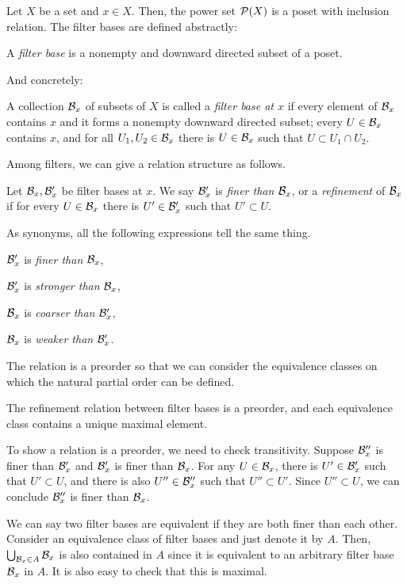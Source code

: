 \documentclass{../crs}
\begin{document}
Let $X$ be a set and $x\in X$.
Then, the power set $\mathcal{P}(X)$ is a poset with inclusion relation.
The filter bases are defined abstractly:
\begin{defn}
A \emph{filter base} is a nonempty and downward directed subset of a poset.
\end{defn}
And concretely:
\begin{defn}
A collection $\mathcal{B}_x$ of subsets of $X$ is called a \emph{filter base at $x$} if every element of $\mathcal{B}_x$ contains $x$ and it forms a nonempty downward directed subset; every $U\in\mathcal{B}_x$ contains $x$, and for all $U_1,U_2\in\mathcal{B}_x$ there is $U\in\mathcal{B}_x$ such that $U\subset U_1\cap U_2$.
\end{defn}

Among filters, we can give a relation structure as follows.

\begin{defn}
Let $\mathcal{B}_x,\mathcal{B}'_x$ be filter bases at $x$.
We say $\mathcal{B}'_x$ is \emph{finer than} $\mathcal{B}_x$, or a \emph{refinement} of $\mathcal{B}_x$ if for every $U\in\mathcal{B}_x$ there is $U'\in\mathcal{B}'_x$ such that $U'\subset U$.
\end{defn}

As synonyms, all the following expressions tell the same thing.
\begin{cond}
\item $\mathcal{B}'_x$ is \emph{finer than} $\mathcal{B}_x$,
\item $\mathcal{B}'_x$ is \emph{stronger than} $\mathcal{B}_x$,
\item $\mathcal{B}_x$ is \emph{coarser than} $\mathcal{B}'_x$,
\item $\mathcal{B}_x$ is \emph{weaker than} $\mathcal{B}'_x$.
\end{cond}
The relation is a preorder so that we can consider the equivalence classes on which the natural partial order can be defined.

\begin{prop}
The refinement relation between filter bases is a preorder, and each equivalence class contains a unique maximal element.
\end{prop}
\begin{pf}
To show a relation is a preorder, we need to check transitivity.
Suppose $\mathcal{B}''_x$ is finer than $\mathcal{B}'_x$ and $\mathcal{B}'_x$ is finer than $\mathcal{B}_x$.
For any $U\in\mathcal{B}_x$, there is $U'\in\mathcal{B}'_x$ such that $U'\subset U$, and there is also $U''\in\mathcal{B}''_x$ such that $U''\subset U'$.
Since $U''\subset U$, we can conclude $\mathcal{B}''_x$ is finer than $\mathcal{B}_x$.

We can say two filter bases are equivalent if they are both finer than each other.
Consider an equivalence class of filter bases and just denote it by $A$.
Then, $\bigcup_{\mathcal{B}_x\in A}\mathcal{B}_x$ is also contained in $A$ since it is equivalent to an arbitrary filter base $\mathcal{B}_x$ in $A$.
It is also easy to check that this is maximal.
\end{pf}
\end{document}
